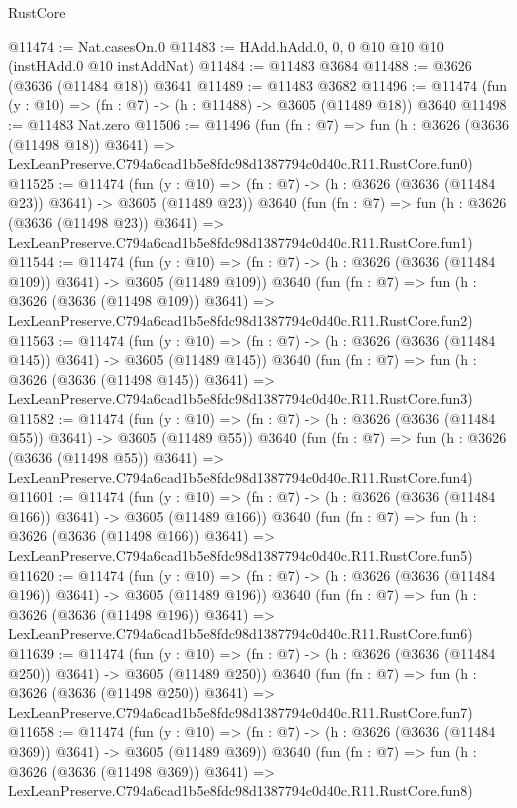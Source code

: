 \begin{lexlean}{RustCore}
\begin{coremodule}
@11474 := Nat.casesOn.{0}
@11483 := HAdd.hAdd.{0, 0, 0} @10 @10 @10 (instHAdd.{0} @10 instAddNat)
@11484 := @11483 @3684
@11488 := @3626 (@3636 (@11484 @18)) @3641
@11489 := @11483 @3682
@11496 := @11474 (fun (y : @10) => (fn : @7) -> (h : @11488) -> @3605 (@11489 @18)) @3640
@11498 := @11483 Nat.zero
@11506 := @11496
    (fun (fn : @7) =>
    fun (h : @3626 (@3636 (@11498 @18)) @3641) =>
    LexLeanPreserve.C794a6cad1b5e8fdc98d1387794c0d40c.R11.RustCore.fun0)
@11525 := @11474
    (fun (y : @10) => (fn : @7) -> (h : @3626 (@3636 (@11484 @23)) @3641) -> @3605 (@11489 @23))
    @3640
    (fun (fn : @7) =>
    fun (h : @3626 (@3636 (@11498 @23)) @3641) =>
    LexLeanPreserve.C794a6cad1b5e8fdc98d1387794c0d40c.R11.RustCore.fun1)
@11544 := @11474
    (fun (y : @10) => (fn : @7) -> (h : @3626 (@3636 (@11484 @109)) @3641) -> @3605 (@11489 @109))
    @3640
    (fun (fn : @7) =>
    fun (h : @3626 (@3636 (@11498 @109)) @3641) =>
    LexLeanPreserve.C794a6cad1b5e8fdc98d1387794c0d40c.R11.RustCore.fun2)
@11563 := @11474
    (fun (y : @10) => (fn : @7) -> (h : @3626 (@3636 (@11484 @145)) @3641) -> @3605 (@11489 @145))
    @3640
    (fun (fn : @7) =>
    fun (h : @3626 (@3636 (@11498 @145)) @3641) =>
    LexLeanPreserve.C794a6cad1b5e8fdc98d1387794c0d40c.R11.RustCore.fun3)
@11582 := @11474
    (fun (y : @10) => (fn : @7) -> (h : @3626 (@3636 (@11484 @55)) @3641) -> @3605 (@11489 @55))
    @3640
    (fun (fn : @7) =>
    fun (h : @3626 (@3636 (@11498 @55)) @3641) =>
    LexLeanPreserve.C794a6cad1b5e8fdc98d1387794c0d40c.R11.RustCore.fun4)
@11601 := @11474
    (fun (y : @10) => (fn : @7) -> (h : @3626 (@3636 (@11484 @166)) @3641) -> @3605 (@11489 @166))
    @3640
    (fun (fn : @7) =>
    fun (h : @3626 (@3636 (@11498 @166)) @3641) =>
    LexLeanPreserve.C794a6cad1b5e8fdc98d1387794c0d40c.R11.RustCore.fun5)
@11620 := @11474
    (fun (y : @10) => (fn : @7) -> (h : @3626 (@3636 (@11484 @196)) @3641) -> @3605 (@11489 @196))
    @3640
    (fun (fn : @7) =>
    fun (h : @3626 (@3636 (@11498 @196)) @3641) =>
    LexLeanPreserve.C794a6cad1b5e8fdc98d1387794c0d40c.R11.RustCore.fun6)
@11639 := @11474
    (fun (y : @10) => (fn : @7) -> (h : @3626 (@3636 (@11484 @250)) @3641) -> @3605 (@11489 @250))
    @3640
    (fun (fn : @7) =>
    fun (h : @3626 (@3636 (@11498 @250)) @3641) =>
    LexLeanPreserve.C794a6cad1b5e8fdc98d1387794c0d40c.R11.RustCore.fun7)
@11658 := @11474
    (fun (y : @10) => (fn : @7) -> (h : @3626 (@3636 (@11484 @369)) @3641) -> @3605 (@11489 @369))
    @3640
    (fun (fn : @7) =>
    fun (h : @3626 (@3636 (@11498 @369)) @3641) =>
    LexLeanPreserve.C794a6cad1b5e8fdc98d1387794c0d40c.R11.RustCore.fun8)

\end{coremodule}
\end{lexlean}
